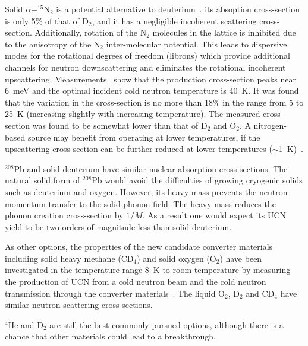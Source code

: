 Solid $\alpha - ^{15}$N$_2$ is a potential alternative to
deuterium~\cite{Salvat2013}. its absoption cross-section is only
5\% of that of D$_2$, and it has a negligible incoherent scattering
cross-section. Additionally, rotation of the N$_2$ molecules in the
lattice is inhibited due to the anisotropy of the N$_2$
inter-molecular potential. This leads to dispersive modes for the
rotational degrees of freedom (librons) which provide additional
channels for neutron downscattering and eliminates the rotational
incoherent upscattering. Measurements~\cite{Salvat2013} show that
the production cross-section peaks near 6~meV and the optimal incident
cold neutron temperature is 40~K. It was found that the variation in
the cross-section is no more than 18\% in the range from 5 to 25~K
(increasing slightly with increasing temperature).  The measured
cross-section was found to be somewhat lower than that of D$_2$ and
O$_2$.
A nitrogen-based source may benefit from operating at lower
temperatures, if the upscattering cross-section can be further reduced
at lower temperatures ($\sim$1~K)~\cite{Salvat2013}.


$^{208}$Pb and solid deuterium have similar nuclear absorption
cross-sections. The natural solid form of $^{208}$Pb would avoid the
difficulties of growing cryogenic solids such as deuterium and
oxygen. However, its heavy mass prevents the neutron momentum transfer
to the solid phonon field. The heavy mass reduces the phonon creation
cross-section by $1/M$. As a result one would expect its UCN yield to
be two orders of magnitude less than solid deuterium.

As other options, the properties of the new candidate converter
materials including solid heavy methane (CD$_4$) and solid oxygen
(O$_2$) have been investigated in the temperature range 8~K to room
temperature by measuring the production of UCN from a cold neutron
beam and the cold neutron transmission through the converter
materials~\cite{Atchison2009}. The liquid O$_2$, D$_2$ and CD$_4$
have similar neutron scattering cross-sections.

$^4$He and D$_2$ are still the best commonly pursued options, although
there is a chance that other materials could lead to a breakthrough.



